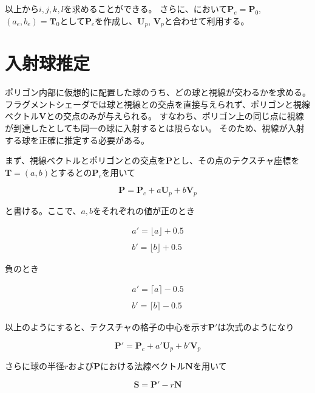 \noindent
以上から$i,j,k,l$を求めることができる。
さらに、において$\bm{P}_e = \bm{P}_0$, $(a_e, b_e) = \bm{T}_0$として$\bm{P}_c$を作成し、$\bm{U}_p$, $\bm{V}_p$と合わせて利用する。

\section{入射球推定}
\label{SFirstsphere}

ポリゴン内部に仮想的に配置した球のうち、どの球と視線が交わるかを求める。
フラグメントシェーダでは球と視線との交点を直接与えられず、ポリゴンと視線ベクトル$\bm{V}$との交点のみが与えられる。
すなわち、ポリゴン上の同じ点に視線が到達したとしても同一の球に入射するとは限らない。
そのため、視線が入射する球を正確に推定する必要がある。

まず、視線ベクトルとポリゴンとの交点を$\bm{P}$とし、その点のテクスチャ座標を$\bm{T} = (a, b)$とするとの$\bm{P}_c$を用いて

\begin{equation}
\label{EP}
\bm{P} = \bm{P}_c + a\bm{U}_p + b\bm{V}_p
\end{equation}

\noindent
と書ける。ここで、$a, b$をそれぞれの値が正のとき

\begin{eqnarray}
\label{Eadashplus}
a' = \lfloor a \rfloor + 0.5\\
\nonumber\\
\label{Ebdashplus}
b' = \lfloor b \rfloor + 0.5
\end{eqnarray}

\noindent
負のとき

\begin{eqnarray}
\label{Eadashminus}
a' = \lceil a \rceil - 0.5\\
\nonumber\\
\label{Ebdashminus}
b' = \lceil b \rceil - 0.5
\end{eqnarray}

\noindent
以上のようにすると、テクスチャの格子の中心を示す$\bm{P}'$は次式のようになり

\begin{equation}
\bm{P}' = \bm{P}_c + a'\bm{U}_p + b'\bm{V}_p 
\label{EPdash}
\end{equation}

\noindent
さらに球の半径$r$および$\bm{P}$における法線ベクトル$\bm{N}$を用いて

\begin{equation}
\bm{S} = \bm{P}' - r\bm{N} 
\label{ESpherepos}
\end{equation}

